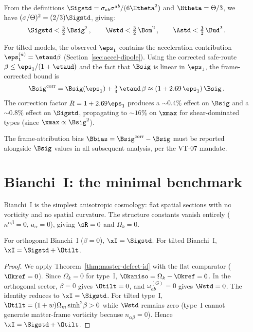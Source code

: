 From the definitions $\Sigstd = \sigma_{ab}\sigma^{ab}/(6\Htheta^2)$
and $\Htheta = \Theta/3$, we have
$(\sigma/\Theta)^2 = (2/3)\Sigstd$, giving:
\begin{equation}\label{eq:Sig2-from-Bsig}
\Sigstd < \tfrac{3}{2}\,\Bsig^2\,,\qquad
\Wstd < \tfrac{3}{2}\,\Bom^2\,,\qquad
\Astd < \tfrac{3}{2}\,\Bud^2\,.
\end{equation}

For tilted models, the observed $\eps_1$ contains the
acceleration contribution
$\eps_1^{(\dot{u})} = \etaud\beta$
(Section~\ref{sec:accel-dipole}).  Using the corrected
safe-route $\beta \leq \eps_1/(1 + \etaud)$ and the fact that
$\Bsig$ is linear in $\eps_1$, the frame-corrected bound is
\begin{equation}\label{eq:Bsig-corr}
\Bsig^{\mathrm{corr}}
= \Bsig(\eps_1) + \tfrac{5}{3}\,\etaud\,\beta
\approx (1 + 2.69\,\eps_1)\,\Bsig\,.
\end{equation}
The correction factor $R = 1 + 2.69\eps_1$ produces a
$\sim 0.4\%$ effect on $\Bsig$ and a $\sim 0.8\%$ effect on
$\Sigstd$, propagating to $\sim 16\%$ on $\xmax$ for
shear-dominated types (since $\xmax \propto \Bsig^2$).

The frame-attribution bias $\Bbias = \Bsig^{\mathrm{corr}} -
\Bsig$ must be reported alongside $\Bsig$ values in all
subsequent analysis, per the VT-07 mandate.


\section{Bianchi~I: the minimal benchmark}\label{sec:BI}

Bianchi~I is the simplest anisotropic cosmology: flat spatial
sections with no vorticity and no spatial curvature.  The
structure constants vanish entirely ($n^{\alpha\beta} = 0$,
$a_\alpha = 0$), giving $\sR = 0$ and $\Omega_k = 0$.

\begin{theorem}
\label{thm:BI-defect}
For orthogonal Bianchi~I ($\beta = 0$), $\xI = \Sigstd$.
For tilted Bianchi~I, $\xI = \Sigstd + \Otilt$.
\end{theorem}

\begin{proof}
We apply Theorem~\ref{thm:master-defect-id} with the flat
comparator ($\Okref = 0$).  Since $\Omega_k = 0$ for type~I,
$\Okaniso = \Omega_k - \Okref = 0$.  In the orthogonal sector,
$\beta = 0$ gives $\Otilt = 0$, and $\omega_{ab}^{(G)} = 0$
gives $\Wstd = 0$.  The identity reduces to
$\xI = \Sigstd$.  For tilted type~I, $\Otilt =
(1+w)\Omega_m\sinh^2\!\beta > 0$ while $\Wstd$ remains zero
(type~I cannot generate matter-frame vorticity because
$n_{\alpha\beta} = 0$).  Hence $\xI = \Sigstd + \Otilt$.
\end{proof}

